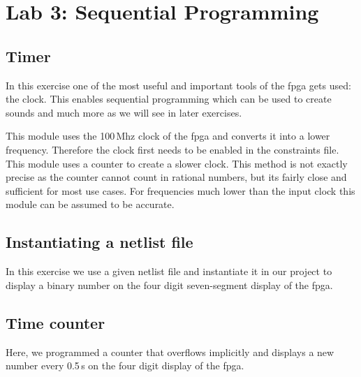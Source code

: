 \chapter{Lab 3: Sequential Programming} \label{day3}



\section{Timer}

In this exercise one of the most useful and important tools of the \gls{fpga} gets used: the clock. This enables sequential programming which can be used to create sounds and much more as we will see in later exercises.

This module uses the 100\,Mhz clock of the \gls{fpga} and converts it into a lower frequency. Therefore the clock first needs to be enabled in the constraints file. This module uses a counter to create a slower clock. This method is not exactly precise as the counter cannot count in rational numbers, but its fairly close and sufficient for most use cases. For frequencies much lower than the input clock this module can be assumed to be accurate.







\section{Instantiating a netlist file}

In this exercise we use a given netlist file and instantiate it in our project to display a binary number on the four digit seven-segment display of the \gls{fpga}. 



\section{Time counter}

Here, we programmed a counter that overflows implicitly and displays a new number every 0.5\,s on the four digit display of the \gls{fpga}. 


